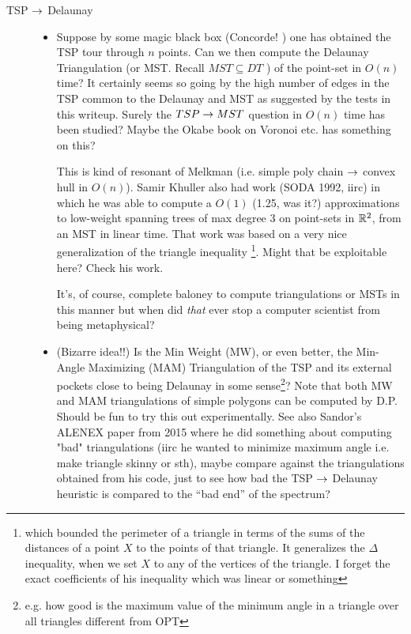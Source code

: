 \begin{appendices}
\begin{description}
\item[\color{red} TSP $\rightarrow$ Delaunay] 

\begin{itemize}
   \item  Suppose by some magic black box (Concorde! \Winkey) one has obtained the TSP tour through $n$ points.  
          Can we then compute the Delaunay Triangulation (or MST. Recall $MST \subseteq DT$  ) of the point-set 
          in $O(n)$ time? It certainly seems so going by the high number of edges in the TSP common to the Delaunay 
          and MST as suggested by the tests in this writeup. Surely the $TSP \rightarrow MST$ question in $O(n)$ time has been studied?
          Maybe the Okabe book on Voronoi etc. has something on this? 

          This is kind of resonant of Melkman (i.e. simple poly chain $\rightarrow$ convex hull in $O(n)$). Samir Khuller also had work (SODA 1992, iirc) 
          in which he was able to compute a $O(1)$ (1.25, was it?) approximations to low-weight spanning trees of max degree 3 on point-sets in $\mathbb{R}^2$, 
          from an MST in linear time. That work was based on a very nice generalization of the triangle inequality 
          \footnote{which bounded the perimeter of a triangle in terms of the sums of the distances of a point $X$ to the points of that triangle. It generalizes the $\Delta$ inequality, when we set $X$ to any of the vertices of the triangle. I forget the exact coefficients of his inequality which was linear or something}.      
          Might that be exploitable here? Check his work. 

          It's, of course, complete baloney to compute triangulations or MSTs in this manner but when did \textit{that} ever stop a computer scientist 
          from being metaphysical?

   \item (Bizarre idea!!) Is the Min Weight (MW), or even better, the Min-Angle Maximizing (MAM) Triangulation of the TSP and its external pockets close 
          to being Delaunay in some sense\footnote{e.g. how good is the maximum value of the minimum angle in a triangle over all triangles different from OPT}?  
          Note that both MW and MAM triangulations of simple polygons can be computed by D.P. Should be fun to try this out experimentally. See also Sandor's 
          ALENEX paper from 2015 where he did something about computing "bad" triangulations (iirc he wanted to minimize maximum angle i.e. make triangle skinny or sth), 
          maybe compare against the triangulations obtained from his code, just to see how bad the TSP $\rightarrow$ Delaunay heuristic is compared 
          to the ``bad end'' of the spectrum? 
\end{itemize}  


\end{description}
\end{appendices}
